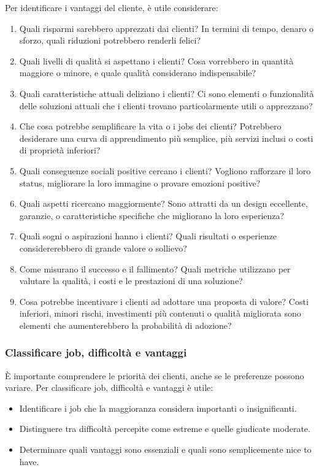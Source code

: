 Per identificare i vantaggi del cliente, è utile considerare:
\begin{enumerate}
    \item Quali risparmi sarebbero apprezzati dai clienti?
In termini di tempo, denaro o sforzo, quali riduzioni potrebbero renderli felici?
    \item Quali livelli di qualità si aspettano i clienti? Cosa vorrebbero in quantità maggiore o minore, e quale qualità considerano indispensabile?
    \item Quali caratteristiche attuali deliziano i clienti? Ci sono elementi o funzionalità delle soluzioni attuali che i clienti trovano particolarmente utili o apprezzano?
    \item Che cosa potrebbe semplificare la vita o i jobs dei clienti? Potrebbero desiderare una curva di apprendimento più semplice, più servizi inclusi o costi di proprietà inferiori?
    \item Quali conseguenze sociali positive cercano i clienti? Vogliono rafforzare il loro status, migliorare la loro immagine o provare emozioni positive?
    \item Quali aspetti ricercano maggiormente? Sono attratti da un design eccellente, garanzie, o caratteristiche specifiche che migliorano la loro esperienza?
    \item Quali sogni o aspirazioni hanno i clienti? Quali risultati o esperienze considererebbero di grande valore o sollievo?
    \item Come misurano il successo e il fallimento? Quali metriche utilizzano per valutare la qualità, i costi e le prestazioni di una soluzione?
    \item Cosa potrebbe incentivare i clienti ad adottare una proposta di valore? Costi inferiori, minori rischi, investimenti più contenuti o qualità migliorata sono elementi che aumenterebbero la probabilità di adozione?
\end{enumerate}

\subsubsection{Classificare job, difficoltà e vantaggi}
È importante comprendere le priorità dei clienti, anche se le preferenze possono variare. Per classificare job, difficoltà e vantaggi è utile:
\begin{itemize}
    \item Identificare i job che la maggioranza considera importanti o insignificanti.
    \item Distinguere tra difficoltà percepite come estreme e quelle giudicate moderate.
    \item Determinare quali vantaggi sono essenziali e quali sono semplicemente nice to have.
\end{itemize}

